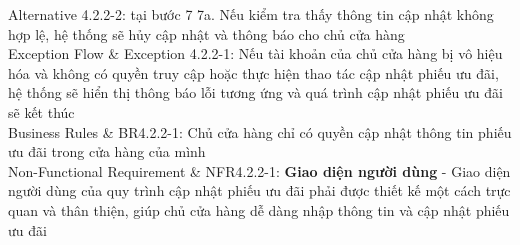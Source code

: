 \begin{usecase_table}
                    Alternative 4.2.2-2: tại bước 7\newline
                    7a. Nếu kiểm tra thấy thông tin cập nhật không hợp lệ, hệ thống sẽ hủy cập nhật và thông báo cho chủ cửa hàng\\
                    \hline
                    Exception Flow & Exception 4.2.2-1: Nếu tài khoản của chủ cửa hàng bị vô hiệu hóa và không có quyền truy cập hoặc thực hiện thao tác cập nhật phiếu ưu đãi, hệ thống sẽ hiển thị thông báo lỗi tương ứng và quá trình cập nhật phiếu ưu đãi sẽ kết thúc\\
                    \hline
                    Business Rules	& BR4.2.2-1: Chủ cửa hàng chỉ có quyền cập nhật thông tin phiếu ưu đãi trong cửa hàng của mình \\
                    \hline
                    Non-Functional Requirement & NFR4.2.2-1: \textbf{Giao diện người dùng} - Giao diện người dùng của quy trình cập nhật phiếu ưu đãi phải được thiết kế một cách trực quan và thân thiện, giúp chủ cửa hàng dễ dàng nhập thông tin và cập nhật phiếu ưu đãi
                    \\
                    \hline
                \end{usecase_table}             

